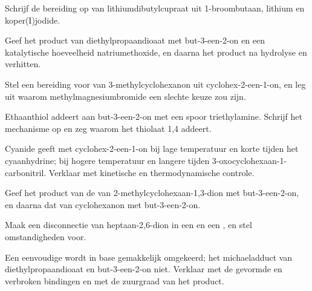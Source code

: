 \begin{exercise}[$\star$]\label{exo:b2:conjugate-additions:3}
Schrijf de bereiding op van lithiumdibutylcupraat uit 1-broombutaan, lithium en koper(I)jodide.
\end{exercise}

\begin{exercise}[$\star$]\label{exo:b2:conjugate-additions:4}
Geef het product van diethylpropaandioaat met but-3-een-2-on en een katalytische hoeveelheid
natriumethoxide, en daarna het product na hydrolyse en verhitten.
\end{exercise}

\begin{exercise}[$\star\star$]\label{exo:b2:conjugate-additions:5}
Stel een bereiding voor van 3-methylcyclohexanon uit cyclohex-2-een-1-on, en leg uit waarom
methylmagnesiumbromide een slechte keuze zou zijn.
\end{exercise}

\begin{exercise}[$\star\star$]\label{exo:b2:conjugate-additions:6}
Ethaanthiol addeert aan but-3-een-2-on met een spoor triethylamine. Schrijf het mechanisme op en zeg waarom het
thiolaat 1,4 addeert.
\end{exercise}

\begin{exercise}[$\star\star$]\label{exo:b2:conjugate-additions:7}
Cyanide geeft met cyclohex-2-een-1-on bij lage temperatuur en korte tijden het cyaanhydrine; bij hogere
temperatuur en langere tijden 3-oxocyclohexaan-1-carbonitril. Verklaar met kinetische en thermodynamische
controle.
\end{exercise}

\begin{exercise}[$\star\star$]\label{exo:b2:conjugate-additions:8}
Geef het product van de  van 2-methylcyclohexaan-1,3-dion met but-3-een-2-on, en daarna dat
van cyclohexanon met but-3-een-2-on.
\end{exercise}

\begin{exercise}[$\star\star$]\label{exo:b2:conjugate-additions:9}
Maak een disconnectie van heptaan-2,6-dion in een  en een , en stel omstandigheden voor.
\end{exercise}

\begin{exercise}[$\star\star\star$]\label{exo:b2:conjugate-additions:10}
Een eenvoudige  wordt in base gemakkelijk omgekeerd; het michaeladduct van diethylpropaandioaat en
but-3-een-2-on niet. Verklaar met de gevormde en verbroken bindingen en met de zuurgraad van het product.
\end{exercise}

